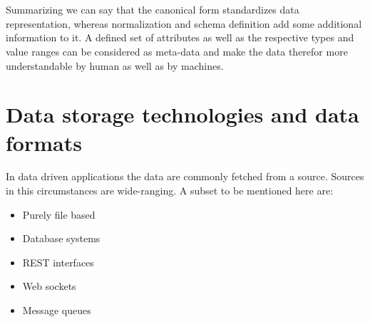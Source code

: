 \\\\
Summarizing we can say that the canonical form standardizes data representation, whereas normalization and schema definition add some additional information to it. A defined set of attributes as well as the respective types and value ranges can be considered as meta-data and make the data therefor more understandable by human as well as by machines. 

\section{Data storage technologies and data formats\label{sec:storage}}

In data driven applications the data are commonly fetched from a source. Sources in this circumstances are wide-ranging. A subset to be mentioned here are:
\begin{itemize}
  \item Purely file based
  \item Database systems
  \item REST interfaces
  \item Web sockets
  \item Message queues\\
\end{itemize}

